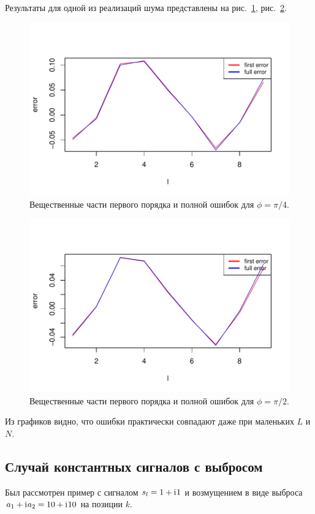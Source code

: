 \documentclass[specialist,
               substylefile = spbu.rtx,
               subf,href,colorlinks=true, 12pt]{disser}
\begin{document}
Результаты для одной из реализаций шума представлены на рис.~\ref{fig:harm_noise_pi_4}, рис.~\ref{fig:harm_noise_pi_2}.

\begin{figure}[H]
	\begin{center}
		\includegraphics[width=0.6\linewidth]{img/first_vs_full_re.pdf}
		\caption{Вещественные части первого порядка и полной ошибок для $\phi = \pi / 4$.}
		\label{fig:harm_noise_pi_4}
	\end{center}
\end{figure}

\begin{figure}[H]
	\begin{center}
		\includegraphics[width=0.6\linewidth]{img/first_vs_full_re_2.pdf}
		\caption{Вещественные части первого порядка и полной ошибок для $\phi = \pi / 2$.}
		\label{fig:harm_noise_pi_2}
	\end{center}
\end{figure}


Из графиков видно, что ошибки практически совпадают даже при маленьких $L$ и $N$.

\subsection{Случай константных сигналов с выбросом}

Был рассмотрен пример с сигналом $s_l = 1 + \mathrm{i}\mkern1mu 1$ и возмущением в виде выброса $a_1 + \mathrm{i}\mkern1mu a_2 = 10 + \mathrm{i}\mkern1mu 10$ на позиции $k$. 
\end{document}
